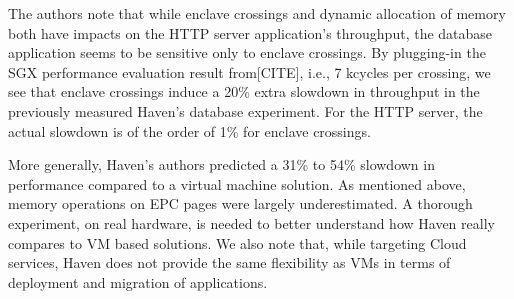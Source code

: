 The authors note that while enclave crossings and dynamic allocation of memory both have impacts on the HTTP server application's throughput, the database application seems to be sensitive only to enclave crossings.
By plugging-in the SGX performance evaluation result from[CITE], i.e., 7 kcycles per crossing, we see that enclave crossings induce a 20\% extra slowdown in throughput in the previously measured Haven's database experiment.
For the HTTP server, the actual slowdown is of the order of 1\% for enclave crossings.

More generally, Haven's authors predicted a 31\% to 54\% slowdown in performance compared to a virtual machine solution.
As mentioned above, memory operations on EPC pages were largely underestimated.
A thorough experiment, on real hardware, is needed to better understand how Haven really compares to VM based solutions.
We also note that, while targeting Cloud services, Haven does not provide the same flexibility as VMs in terms of deployment and migration of applications.
